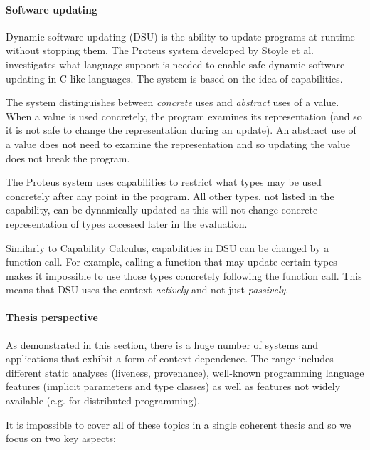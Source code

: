 
\paragraph{Software updating}
Dynamic software updating (DSU) \cite{app-dsu-programs,app-dsu} is the ability to update programs at
runtime without stopping them. The Proteus system developed by Stoyle et al. \cite{app-dsu-mutatis} 
investigates what language support is needed to enable safe dynamic software updating in C-like 
languages. The system is based on the idea of capabilities.

The system distinguishes between \emph{concrete} uses and \emph{abstract} uses of a value. When
a value is used concretely, the program examines its representation (and so it is not safe to
change the representation during an update). An abstract use of a value does not need to examine
the representation and so updating the value does not break the program.

The Proteus system uses capabilities to restrict what types may be used concretely after any point
in the program. All other types, not listed in the capability, can be dynamically updated as this
will not change concrete representation of types accessed later in the evaluation.

Similarly to Capability Calculus, capabilities in DSU can be changed by a function call. For 
example, calling a function that may update certain types makes it impossible to use those types
concretely following the function call. This means that DSU uses the context \emph{actively}
and not just \emph{passively}.


\paragraph{Thesis perspective}

As demonstrated in this section, there is a huge number of systems and applications that exhibit
a form of context-dependence. The range includes different static analyses (liveness, provenance), 
well-known programming language features (implicit parameters and type classes) as well as features
not widely available (e.g. for distributed programming).

It is impossible to cover all of these topics in a single coherent thesis and so we focus on 
two key aspects:

